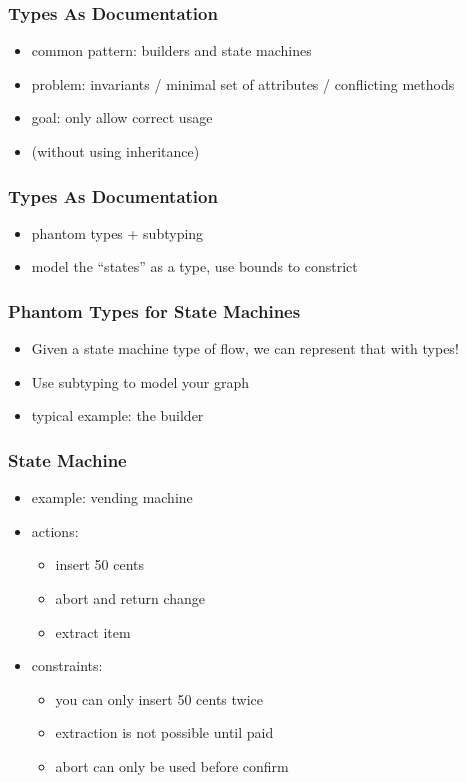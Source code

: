 \documentclass{beamer}
\begin{document}
\begin{frame}
  \frametitle{Types As Documentation}
  \begin{itemize}
  \item common pattern: builders and state machines
  \item problem: invariants / minimal set of attributes / conflicting
    methods
  \item goal: only allow correct usage
  \item (without using inheritance)
  \end{itemize}
\end{frame}

\begin{frame}
  \frametitle{Types As Documentation}
  \begin{itemize}
  \item phantom types + subtyping
  \item model the ``states'' as a type, use bounds to constrict
  \end{itemize}
\end{frame}

\begin{frame}
  \frametitle{Phantom Types for State Machines}
  \begin{itemize}
  \item Given a state machine type of flow, we can represent that with
    types!
  \item Use subtyping to model your graph
  \item typical example: the builder
  \end{itemize}
\end{frame}

\begin{frame}
  \frametitle{State Machine}
  \begin{itemize}
  \item example: vending machine
  \item actions:
    \begin{itemize}
    \item insert 50 cents
    \item abort and return change
    \item extract item
    \end{itemize}
  \item constraints:
    \begin{itemize}
    \item you can only insert 50 cents twice
    \item extraction is not possible until paid
    \item abort can only be used before confirm
    \end{itemize}
  \end{itemize}
\end{frame}
\end{document}
